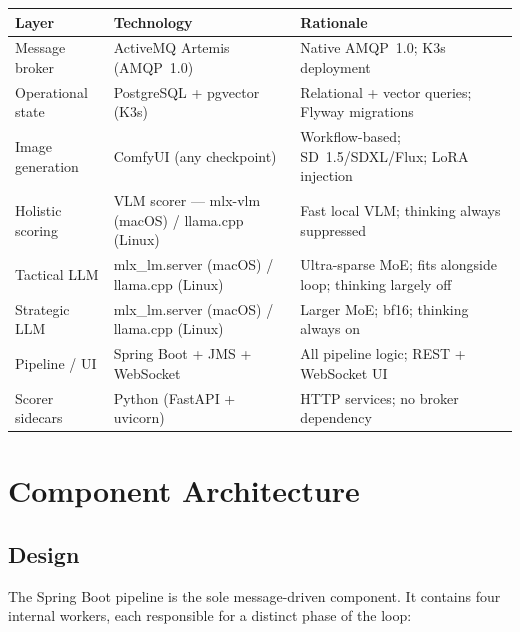 \documentclass[11pt,letterpaper]{article}
\begin{document}
\begin{center}
\begin{tabular}{lll}
\toprule
\textbf{Layer} & \textbf{Technology} & \textbf{Rationale} \\
\midrule
Message broker    & ActiveMQ Artemis (AMQP~1.0)             & Native AMQP~1.0; K3s deployment \\
Operational state & PostgreSQL + pgvector (K3s)             & Relational + vector queries; Flyway migrations \\
Image generation  & ComfyUI (any checkpoint)                & Workflow-based; SD~1.5/SDXL/Flux; LoRA injection \\
Holistic scoring  & VLM scorer --- mlx-vlm (macOS) / llama.cpp (Linux) & Fast local VLM; thinking always suppressed \\
Tactical LLM      & mlx\_lm.server (macOS) / llama.cpp (Linux)          & Ultra-sparse MoE; fits alongside loop; thinking largely off \\
Strategic LLM     & mlx\_lm.server (macOS) / llama.cpp (Linux)          & Larger MoE; bf16; thinking always on \\
Pipeline / UI     & Spring Boot + JMS + WebSocket           & All pipeline logic; REST + WebSocket UI \\
Scorer sidecars   & Python (FastAPI + uvicorn)              & HTTP services; no broker dependency \\
\bottomrule
\end{tabular}
\end{center}

\section{Component Architecture}

\subsection{Design}

The Spring Boot pipeline is the sole message-driven component. It contains
four internal workers, each responsible for a distinct phase of the loop:
\end{document}

